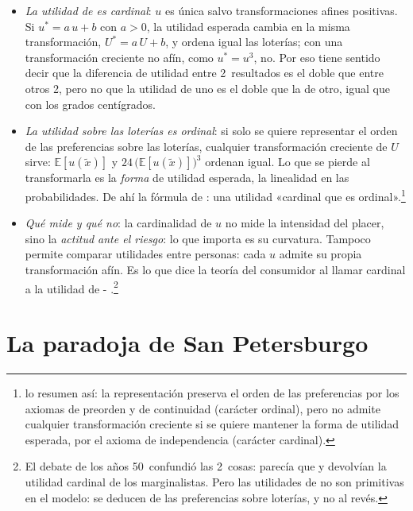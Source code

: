 \documentclass[11pt]{article}
\begin{document}
\begin{itemize}
\item \emph{La utilidad de  es cardinal}: $u$ es única salvo transformaciones afines positivas. Si $u^*=a\,u+b$ con $a>0$, la utilidad esperada cambia en la misma transformación, $U^*=a\,U+b$, y ordena igual las loterías; con una transformación creciente no afín, como $u^*=u^3$, no. Por eso tiene sentido decir que la diferencia de utilidad entre 2~resultados es el doble que entre otros 2, pero no que la utilidad de uno es el doble que la de otro, igual que con los grados centígrados.
\item \emph{La utilidad sobre las loterías es ordinal}: si solo se quiere representar el orden de las preferencias sobre las loterías, cualquier transformación creciente de $U$ sirve: $\mathbb{E}[u(\tilde{x})]$ y $24\,\big(\mathbb{E}[u(\tilde{x})]\big)^3$ ordenan igual. Lo que se pierde al transformarla es la \emph{forma} de utilidad esperada, la linealidad en las probabilidades. De ahí la fórmula de \textcite{Baumol1958Cardinal}: una utilidad «cardinal que es ordinal».\footnote{\textcite[pág.~203]{MatePerez2007Microeconomia} lo resumen así: la representación preserva el orden de las preferencias por los axiomas de preorden y de continuidad (carácter ordinal), pero no admite cualquier transformación creciente si se quiere mantener la forma de utilidad esperada, por el axioma de independencia (carácter cardinal).}
\item \emph{Qué mide y qué no}: la cardinalidad de $u$ no mide la intensidad del placer, sino la \emph{actitud ante el riesgo}: lo que importa es su curvatura. Tampoco permite comparar utilidades entre personas: cada $u$ admite su propia transformación afín. Es lo que dice la teoría del consumidor al llamar cardinal a la utilidad de - .\footnote{El debate de los años 50~confundió las 2~cosas: parecía que  y  devolvían la utilidad cardinal de los marginalistas. Pero las utilidades de  no son primitivas en el modelo: se deducen de las preferencias sobre loterías, y no al revés\nocite{Machina2018Expected}.}
\end{itemize}

\section{La paradoja de San Petersburgo}\label{anexo:san-petersburgo}
\end{document}
